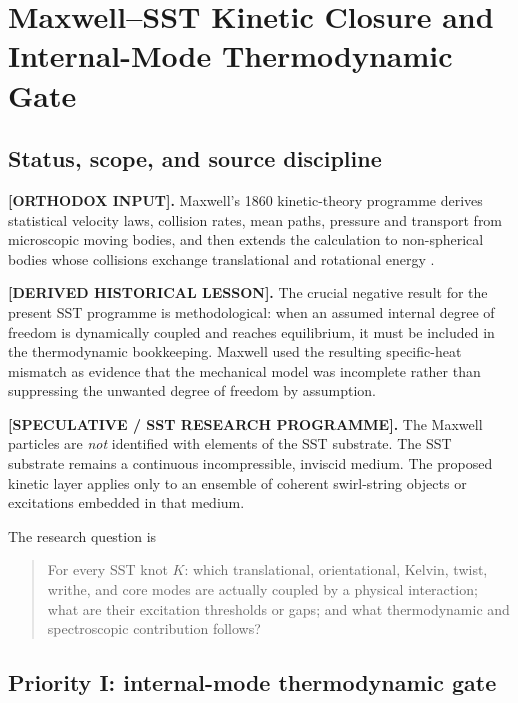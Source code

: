 
\section{Maxwell--SST Kinetic Closure and Internal-Mode Thermodynamic Gate}
    \label{sec:rt_maxwell_sst_kinetic_gate}

\subsection{Status, scope, and source discipline}

\textbf{[ORTHODOX INPUT].}
Maxwell's 1860 kinetic-theory programme derives statistical velocity laws,
collision rates, mean paths, pressure and transport from microscopic moving
bodies, and then extends the calculation to non-spherical bodies whose
collisions exchange translational and rotational energy
\cite{Maxwell1860GasesI,Maxwell1860GasesIIIII}.

\textbf{[DERIVED HISTORICAL LESSON].}
The crucial negative result for the present SST programme is methodological:
when an assumed internal degree of freedom is dynamically coupled and reaches
equilibrium, it must be included in the thermodynamic bookkeeping.  Maxwell
used the resulting specific-heat mismatch as evidence that the mechanical model
was incomplete rather than suppressing the unwanted degree of freedom by
assumption.

\textbf{[SPECULATIVE / SST RESEARCH PROGRAMME].}
The Maxwell particles are \emph{not} identified with elements of the SST
substrate.  The SST substrate remains a continuous incompressible, inviscid
medium.  The proposed kinetic layer applies only to an ensemble of coherent
swirl-string objects or excitations embedded in that medium.

The research question is
\begin{quote}
For every SST knot $K$: which translational, orientational, Kelvin, twist,
writhe, and core modes are actually coupled by a physical interaction; what are
their excitation thresholds or gaps; and what thermodynamic and spectroscopic
contribution follows?
\end{quote}

\subsection{Priority I: internal-mode thermodynamic gate}
    \label{subsec:rt_maxwell_mode_gate}

